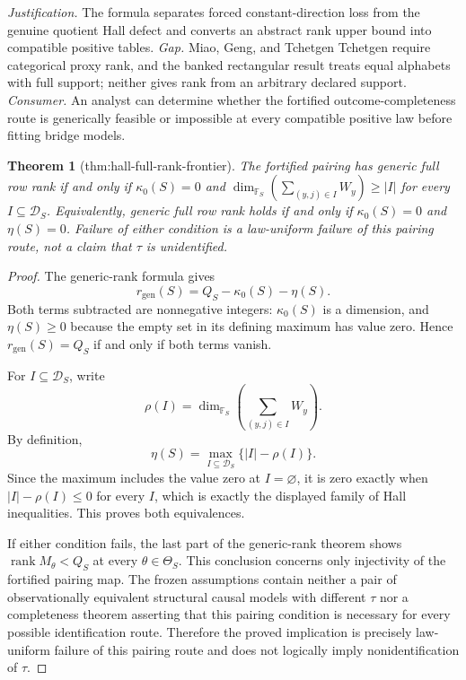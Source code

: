 \documentclass{article}
\newtheorem{theorem}{Theorem}
\begin{document}
\par\smallskip\noindent \textit{Justification.} The formula separates forced constant-direction loss from the genuine quotient Hall defect and converts an abstract rank upper bound into compatible positive tables. \textit{Gap.} Miao, Geng, and Tchetgen Tchetgen require categorical proxy rank, and the banked rectangular result treats equal alphabets with full support; neither gives rank from an arbitrary declared support. \textit{Consumer.} An analyst can determine whether the fortified outcome-completeness route is generically feasible or impossible at every compatible positive law before fitting bridge models.

\begin{theorem}[thm:hall-full-rank-frontier]\label{thm:hall-full-rank-frontier}
The fortified pairing has generic full row rank if and only if \(\kappa_0(S)=0\) and \(\dim_{\mathbb F_S}(\sum_{(y,j)\in I}W_y)\ge|I|\) for every \(I\subseteq\mathcal D_S\). Equivalently, generic full row rank holds if and only if \(\kappa_0(S)=0\) and \(\eta(S)=0\). Failure of either condition is a law-uniform failure of this pairing route, not a claim that \(\tau\) is unidentified.
\end{theorem}
\begin{proof}
The generic-rank formula gives
\[
r_{\mathrm{gen}}(S)=Q_S-\kappa_0(S)-\eta(S).
\]
Both terms subtracted are nonnegative integers: \(\kappa_0(S)\) is a dimension, and \(\eta(S)\ge0\) because the empty set in its defining maximum has value zero.  Hence \(r_{\mathrm{gen}}(S)=Q_S\) if and only if both terms vanish.

For \(I\subseteq\mathcal D_S\), write
\[
\rho(I)=\dim_{\mathbb F_S}\left(\sum_{(y,j)\in I}W_y\right).
\]
By definition,
\[
\eta(S)=\max_{I\subseteq\mathcal D_S}\{|I|-\rho(I)\}.
\]
Since the maximum includes the value zero at \(I=\varnothing\), it is zero exactly when \(|I|-\rho(I)\le0\) for every \(I\), which is exactly the displayed family of Hall inequalities.  This proves both equivalences.

If either condition fails, the last part of the generic-rank theorem shows \(\operatorname{rank}M_\theta<Q_S\) at every \(\theta\in\Theta_S\).  This conclusion concerns only injectivity of the fortified pairing map.  The frozen assumptions contain neither a pair of observationally equivalent structural causal models with different \(\tau\) nor a completeness theorem asserting that this pairing condition is necessary for every possible identification route.  Therefore the proved implication is precisely law-uniform failure of this pairing route and does not logically imply nonidentification of \(\tau\).
\end{proof}
\end{document}
